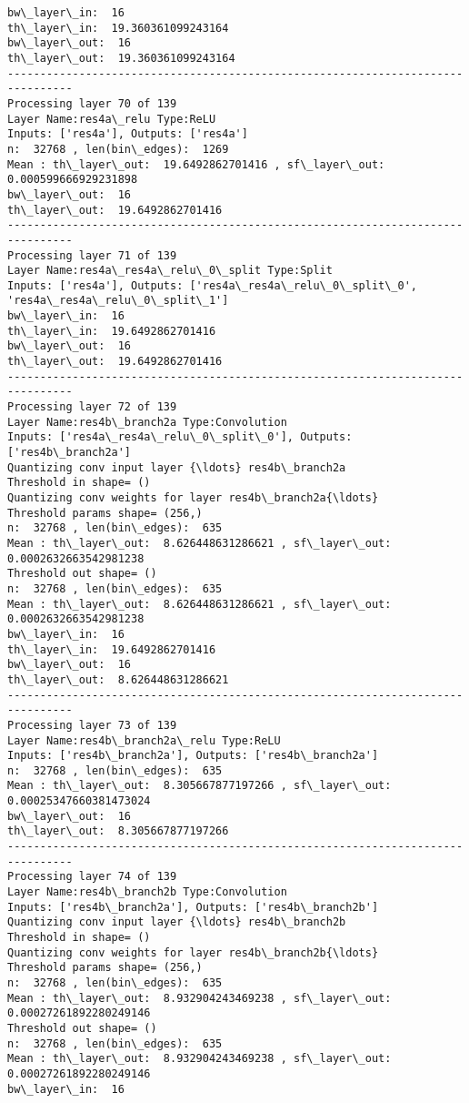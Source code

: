 \documentclass[11pt]{article}
\begin{document}
\begin{Verbatim}[commandchars=\\\{\}]
bw\_layer\_in:  16
th\_layer\_in:  19.360361099243164
bw\_layer\_out:  16
th\_layer\_out:  19.360361099243164
--------------------------------------------------------------------------------
Processing layer 70 of 139
Layer Name:res4a\_relu Type:ReLU
Inputs: ['res4a'], Outputs: ['res4a']
n:  32768 , len(bin\_edges):  1269
Mean : th\_layer\_out:  19.6492862701416 , sf\_layer\_out:  0.000599666929231898
bw\_layer\_out:  16
th\_layer\_out:  19.6492862701416
--------------------------------------------------------------------------------
Processing layer 71 of 139
Layer Name:res4a\_res4a\_relu\_0\_split Type:Split
Inputs: ['res4a'], Outputs: ['res4a\_res4a\_relu\_0\_split\_0', 'res4a\_res4a\_relu\_0\_split\_1']
bw\_layer\_in:  16
th\_layer\_in:  19.6492862701416
bw\_layer\_out:  16
th\_layer\_out:  19.6492862701416
--------------------------------------------------------------------------------
Processing layer 72 of 139
Layer Name:res4b\_branch2a Type:Convolution
Inputs: ['res4a\_res4a\_relu\_0\_split\_0'], Outputs: ['res4b\_branch2a']
Quantizing conv input layer {\ldots} res4b\_branch2a
Threshold in shape= ()
Quantizing conv weights for layer res4b\_branch2a{\ldots}
Threshold params shape= (256,)
n:  32768 , len(bin\_edges):  635
Mean : th\_layer\_out:  8.626448631286621 , sf\_layer\_out:  0.0002632663542981238
Threshold out shape= ()
n:  32768 , len(bin\_edges):  635
Mean : th\_layer\_out:  8.626448631286621 , sf\_layer\_out:  0.0002632663542981238
bw\_layer\_in:  16
th\_layer\_in:  19.6492862701416
bw\_layer\_out:  16
th\_layer\_out:  8.626448631286621
--------------------------------------------------------------------------------
Processing layer 73 of 139
Layer Name:res4b\_branch2a\_relu Type:ReLU
Inputs: ['res4b\_branch2a'], Outputs: ['res4b\_branch2a']
n:  32768 , len(bin\_edges):  635
Mean : th\_layer\_out:  8.305667877197266 , sf\_layer\_out:  0.00025347660381473024
bw\_layer\_out:  16
th\_layer\_out:  8.305667877197266
--------------------------------------------------------------------------------
Processing layer 74 of 139
Layer Name:res4b\_branch2b Type:Convolution
Inputs: ['res4b\_branch2a'], Outputs: ['res4b\_branch2b']
Quantizing conv input layer {\ldots} res4b\_branch2b
Threshold in shape= ()
Quantizing conv weights for layer res4b\_branch2b{\ldots}
Threshold params shape= (256,)
n:  32768 , len(bin\_edges):  635
Mean : th\_layer\_out:  8.932904243469238 , sf\_layer\_out:  0.00027261892280249146
Threshold out shape= ()
n:  32768 , len(bin\_edges):  635
Mean : th\_layer\_out:  8.932904243469238 , sf\_layer\_out:  0.00027261892280249146
bw\_layer\_in:  16

\end{Verbatim}
\end{document}
